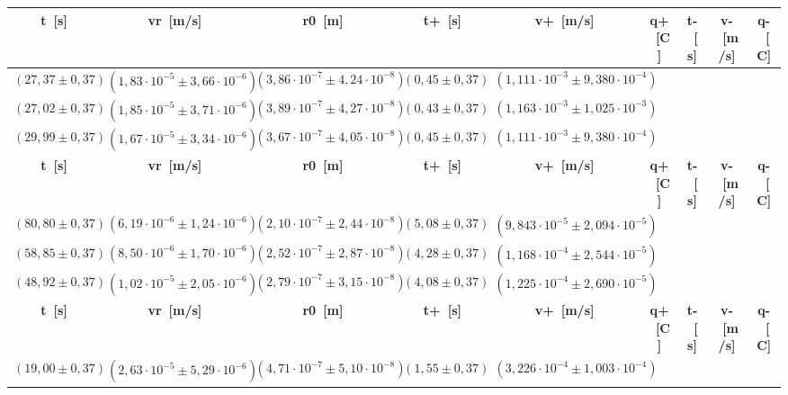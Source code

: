 \documentclass{article}
\begin{document}
\begin{table}[H]
    \centering
    \begin{flushleft}
    \begin{tabular}{|c|c|c|c|c|c|c|c|c|}
        \toprule
        \textbf{t~[s]} & \textbf{vr~[m/s]} & \textbf{r0~[m]} & \textbf{t+~[s]} & \textbf{v+~[m/s]} & \textbf{q+~[C]} & \textbf{t-~[s]} & \textbf{v-~[m/s]} & \textbf{q-~[C]} \\
        \midrule
        \((27,37 \pm 0,37)\) & \((1,83 \cdot 10^{-5} \pm 3,66 \cdot 10^{-6})\) & \((3,86 \cdot 10^{-7} \pm 4,24 \cdot 10^{-8})\) & \((0,45 \pm 0,37)\) & \((1,111 \cdot 10^{-3} \pm 9,380 \cdot 10^{-4})\) \\
        \((27,02 \pm 0,37)\) & \((1,85 \cdot 10^{-5} \pm 3,71 \cdot 10^{-6})\) & \((3,89 \cdot 10^{-7} \pm 4,27 \cdot 10^{-8})\) & \((0,43 \pm 0,37)\) & \((1,163 \cdot 10^{-3} \pm 1,025 \cdot 10^{-3})\) \\
        \((29,99 \pm 0,37)\) & \((1,67 \cdot 10^{-5} \pm 3,34 \cdot 10^{-6})\) & \((3,67 \cdot 10^{-7} \pm 4,05 \cdot 10^{-8})\) & \((0,45 \pm 0,37)\) & \((1,111 \cdot 10^{-3} \pm 9,380 \cdot 10^{-4})\) \\
        \toprule
        \textbf{t~[s]} & \textbf{vr~[m/s]} & \textbf{r0~[m]} & \textbf{t+~[s]} & \textbf{v+~[m/s]} & \textbf{q+~[C]} & \textbf{t-~[s]} & \textbf{v-~[m/s]} & \textbf{q-~[C]} \\
        \midrule
        \((80,80 \pm 0,37)\) & \((6,19 \cdot 10^{-6} \pm 1,24 \cdot 10^{-6})\) & \((2,10 \cdot 10^{-7} \pm 2,44 \cdot 10^{-8})\) & \((5,08 \pm 0,37)\) & \((9,843 \cdot 10^{-5} \pm 2,094 \cdot 10^{-5})\) \\
        \((58,85 \pm 0,37)\) & \((8,50 \cdot 10^{-6} \pm 1,70 \cdot 10^{-6})\) & \((2,52 \cdot 10^{-7} \pm 2,87 \cdot 10^{-8})\) & \((4,28 \pm 0,37)\) & \((1,168 \cdot 10^{-4} \pm 2,544 \cdot 10^{-5})\) \\
        \((48,92 \pm 0,37)\) & \((1,02 \cdot 10^{-5} \pm 2,05 \cdot 10^{-6})\) & \((2,79 \cdot 10^{-7} \pm 3,15 \cdot 10^{-8})\) & \((4,08 \pm 0,37)\) & \((1,225 \cdot 10^{-4} \pm 2,690 \cdot 10^{-5})\) \\
        \toprule
        \textbf{t~[s]} & \textbf{vr~[m/s]} & \textbf{r0~[m]} & \textbf{t+~[s]} & \textbf{v+~[m/s]} & \textbf{q+~[C]} & \textbf{t-~[s]} & \textbf{v-~[m/s]} & \textbf{q-~[C]} \\
        \midrule
        \((19,00 \pm 0,37)\) & \((2,63 \cdot 10^{-5} \pm 5,29 \cdot 10^{-6})\) & \((4,71 \cdot 10^{-7} \pm 5,10 \cdot 10^{-8})\) & \((1,55 \pm 0,37)\) & \((3,226 \cdot 10^{-4} \pm 1,003 \cdot 10^{-4})\) \\

\end{tabular}
\end{flushleft}
\end{table}
\end{document}
